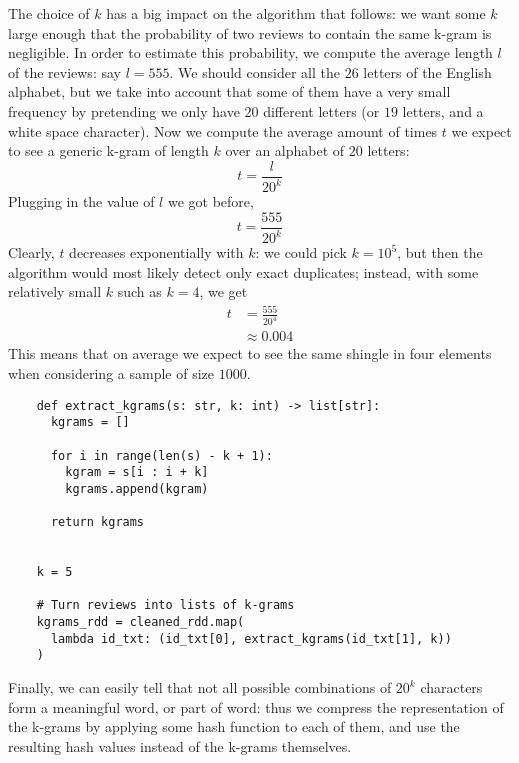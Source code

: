\documentclass{article}
\begin{document}
  The choice of \( k \) has a big impact on the algorithm that follows: we want
  some \( k \) large enough that the probability of two reviews to contain the
  same k-gram is negligible. In order to estimate this probability, we compute
  the average length \( l \) of the reviews: say \( l = 555 \). We should
  consider all the \( 26 \) letters of the English alphabet, but we take into
  account that some of them have a very small frequency by pretending we only
  have \( 20 \) different letters (or \( 19 \) letters, and a white space
  character). Now we compute the average amount of times \( t \) we expect to
  see a generic k-gram of length \( k \) over an alphabet of \( 20 \) letters:
  \[
    t = \frac{ l }{ { 20 }^k }
  \]
  Plugging in the value of \( l \) we got before,
  \[
    t = \frac{ 555 }{ { 20 }^k }
  \]
  Clearly, \( t \) decreases exponentially with \( k \): we could pick
  \( k = { 10 }^5 \), but then the algorithm would most likely detect only
  exact duplicates; instead, with some relatively small \( k \) such as
  \( k = 4 \), we get
  \begin{align*}
    t
    & = \frac{ 555 }{ { 20 }^4 } \\
    & \approx 0.004
  \end{align*}
  This means that on average we expect to see the same shingle in four elements
  when considering a sample of size \( 1000 \). \\
  \begin{verbatim}
    def extract_kgrams(s: str, k: int) -> list[str]:
      kgrams = []

      for i in range(len(s) - k + 1):
        kgram = s[i : i + k]
        kgrams.append(kgram)

      return kgrams


    k = 5

    # Turn reviews into lists of k-grams
    kgrams_rdd = cleaned_rdd.map(
      lambda id_txt: (id_txt[0], extract_kgrams(id_txt[1], k))
    )
  \end{verbatim}
  Finally, we can easily tell that not all possible combinations of
  \( { 20 }^k \) characters form a meaningful word, or part of word: thus we
  compress the representation of the k-grams by applying some hash function to
  each of them, and use the resulting hash values instead of the k-grams
  themselves. \\
\end{document}
